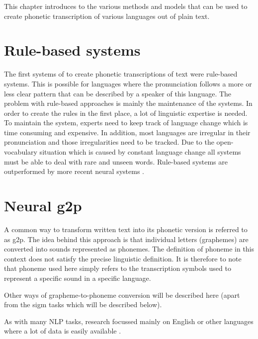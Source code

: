 
\label{chap:3_model}
This chapter introduces to the various methods and models that can be used to create phonetic transcription of various languages out of plain text.

\section{Rule-based systems}
The first systems of to create phonetic transcriptions of text were rule-based systems. This is possible for languages where the pronunciation follows a more or less clear pattern that can be described by a speaker of this language. The problem with rule-based approaches is mainly the maintenance of the systems. In order to create the rules in the first place, a lot of linguistic expertise is needed. To maintain the system, experts need to keep track of language change which is time consuming and expensive. In addition, most languages are irregular in their pronunciation and those irregularities need to be tracked. Due to the open-vocabulary situation which is caused by constant language change all systems must be able to deal with rare and unseen words. Rule-based systems are outperformed by more recent neural systems \citep{gorman-etal-2020-sigmorphon, Ashby&Bartley.2021}.



\section{Neural \ac{g2p}}
A common way to transform written text into its phonetic version is referred to as \ac{g2p}. The idea behind this approach is that individual letters (graphemes) are converted into sounds represented as phonemes. The definition of phoneme in this context does not satisfy the precise linguistic definition. It is therefore to note that phoneme used here simply refers to the transcription symbols used to represent a specific sound in a specific language. 

Other ways of grapheme-to-phoneme conversion will be described here (apart from the \ac{sigm} tasks which will be described below). 

As with many NLP tasks, research focussed mainly on English or other languages where a lot of data is easily available \citep{gorman-etal-2020-sigmorphon}.


